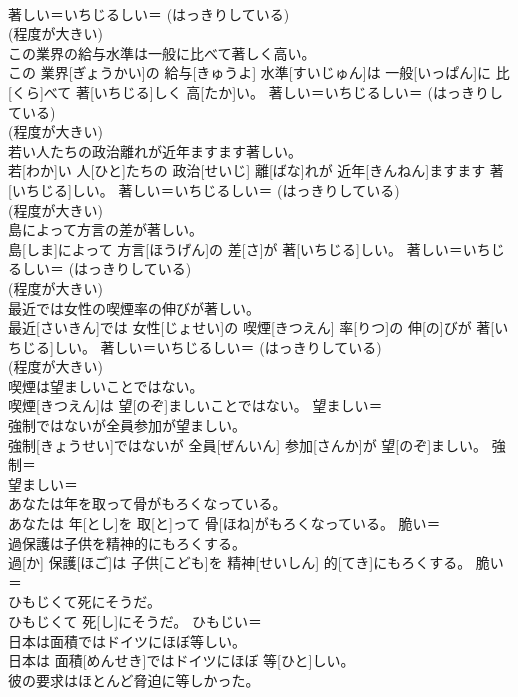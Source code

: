 \documentclass[8pt]{extreport}
\begin{document}
\begin{CJK}{UTF8}{min}
\\	著しい＝いちじるしい＝ (はっきりしている) 
\\	(程度が大きい) 
\\	この業界の給与水準は一般に比べて著しく高い。	
\\	この 業界[ぎょうかい]の 給与[きゅうよ] 水準[すいじゅん]は 一般[いっぱん]に 比[くら]べて 著[いちじる]しく 高[たか]い。	著しい＝いちじるしい＝ (はっきりしている) 
\\	(程度が大きい) 
\\	若い人たちの政治離れが近年ますます著しい。	
\\	若[わか]い 人[ひと]たちの 政治[せいじ] 離[ばな]れが 近年[きんねん]ますます 著[いちじる]しい。	著しい＝いちじるしい＝ (はっきりしている) 
\\	(程度が大きい) 
\\	島によって方言の差が著しい。	
\\	島[しま]によって 方言[ほうげん]の 差[さ]が 著[いちじる]しい。	著しい＝いちじるしい＝ (はっきりしている) 
\\	(程度が大きい) 
\\	最近では女性の喫煙率の伸びが著しい。	
\\	最近[さいきん]では 女性[じょせい]の 喫煙[きつえん] 率[りつ]の 伸[の]びが 著[いちじる]しい。	著しい＝いちじるしい＝ (はっきりしている) 
\\	(程度が大きい) 
\\	喫煙は望ましいことではない。	
\\	喫煙[きつえん]は 望[のぞ]ましいことではない。	望ましい＝ 
\\	強制ではないが全員参加が望ましい。	
\\	強制[きょうせい]ではないが 全員[ぜんいん] 参加[さんか]が 望[のぞ]ましい。	強制＝ 
\\	望ましい＝ 
\\	あなたは年を取って骨がもろくなっている。	
\\	あなたは 年[とし]を 取[と]って 骨[ほね]がもろくなっている。	脆い＝ 
\\	過保護は子供を精神的にもろくする。	
\\	過[か] 保護[ほご]は 子供[こども]を 精神[せいしん] 的[てき]にもろくする。	脆い＝ 
\\	ひもじくて死にそうだ。	
\\	ひもじくて 死[し]にそうだ。	ひもじい＝ 
\\	日本は面積ではドイツにほぼ等しい。	
\\	日本は 面積[めんせき]ではドイツにほぼ 等[ひと]しい。	
\\	彼の要求はほとんど脅迫に等しかった。	

\end{CJK}
\end{document}
